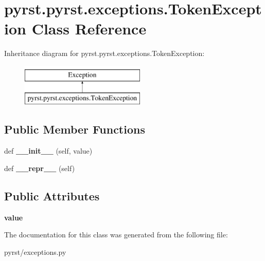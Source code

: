 \hypertarget{classpyrst_1_1pyrst_1_1exceptions_1_1_token_exception}{}\section{pyrst.\+pyrst.\+exceptions.\+Token\+Exception Class Reference}
\label{classpyrst_1_1pyrst_1_1exceptions_1_1_token_exception}
Inheritance diagram for pyrst.\+pyrst.\+exceptions.\+Token\+Exception\+:\begin{figure}[H]
\begin{center}
\leavevmode
\includegraphics[height=2.000000cm]{classpyrst_1_1pyrst_1_1exceptions_1_1_token_exception}
\end{center}
\end{figure}
\subsection*{Public Member Functions}
\begin{DoxyCompactItemize}
\item 
\hypertarget{classpyrst_1_1pyrst_1_1exceptions_1_1_token_exception_a49b4f43747cd51fc89a65a5cbf41effd}{}def {\bfseries \+\_\+\+\_\+init\+\_\+\+\_\+} (self, value)\label{classpyrst_1_1pyrst_1_1exceptions_1_1_token_exception_a49b4f43747cd51fc89a65a5cbf41effd}

\item 
\hypertarget{classpyrst_1_1pyrst_1_1exceptions_1_1_token_exception_a27ddf6a9367becc47dd49120833b597b}{}def {\bfseries \+\_\+\+\_\+repr\+\_\+\+\_\+} (self)\label{classpyrst_1_1pyrst_1_1exceptions_1_1_token_exception_a27ddf6a9367becc47dd49120833b597b}

\end{DoxyCompactItemize}
\subsection*{Public Attributes}
\begin{DoxyCompactItemize}
\item 
\hypertarget{classpyrst_1_1pyrst_1_1exceptions_1_1_token_exception_a8d767bd65e335b8dd1fa3ac19df0768c}{}{\bfseries value}\label{classpyrst_1_1pyrst_1_1exceptions_1_1_token_exception_a8d767bd65e335b8dd1fa3ac19df0768c}

\end{DoxyCompactItemize}


The documentation for this class was generated from the following file\+:\begin{DoxyCompactItemize}
\item 
pyrst/exceptions.\+py\end{DoxyCompactItemize}
